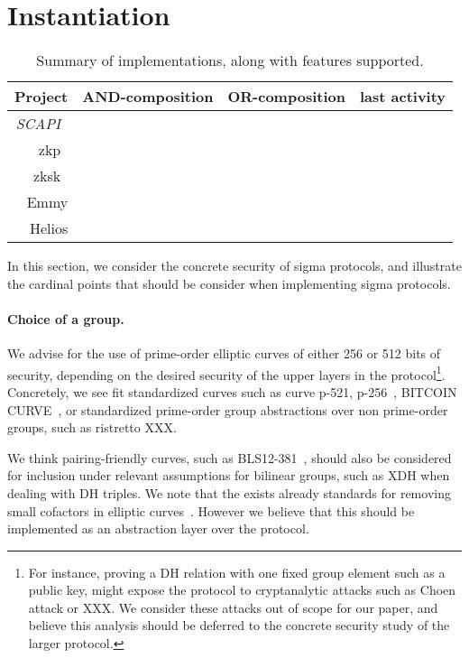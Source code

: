 \documentclass[runningheads]{llncs}
\begin{document}
\section{Instantiation }

\begin{table}[t]
  \caption{Summary of implementations, along with features supported.  }
\begin{tabular}{r|ccc}
  Project & AND-composition & OR-composition & last activity \\
  \hline
  \emph{SCAPI}~\cite{scapi}\\
  zkp~\cite{zkp}\\
  zksk~\cite{zksk}\\
  Emmy\\
  Helios \\
\end{tabular}
\end{table}

In this section, we consider the concrete security of sigma protocols, and illustrate the cardinal points that should be consider when implementing sigma protocols.

\paragraph{Choice of a group.} We advise for the use of prime-order elliptic curves of either 256 or 512 bits of security, depending on the desired security of the upper layers in the protocol\footnote{For instance, proving a DH relation with one fixed group element such as a public key, might expose the protocol to cryptanalytic attacks such as Choen attack or XXX. We consider these attacks out of scope for our paper, and believe this analysis should be deferred to the concrete security study of the larger protocol.}.
Concretely, we see fit standardized curves such as curve p-521, p-256~\cite{XXX}, BITCOIN CURVE~\cite{XX}, or standardized prime-order group abstractions over non prime-order groups, such as ristretto XXX.

We think pairing-friendly curves, such as BLS12-381~\cite{XX}, should also be considered for inclusion under relevant assumptions for bilinear groups, such as XDH when dealing with DH triples.
We note that the exists already standards for removing small cofactors in elliptic curves~\cite{XX}.
 However we believe that this should be implemented as an abstraction layer over the protocol.
\end{document}
